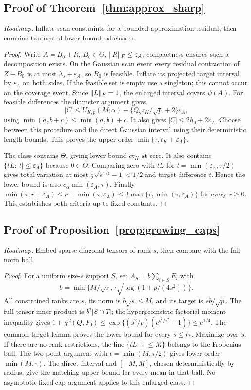\subsection{Proof of Theorem~\ref{thm:approx_sharp}}
\noindent\emph{Roadmap.} Inflate scan constraints for a bounded approximation residual, then combine two nested lower-bound subclasses.
\begin{proof}
Write $A=B_0+R$, $B_0\in\Theta$, $\lVert R\rVert_F\le\varepsilon_A$; compactness ensures such a decomposition exists. On the Gaussian scan event every residual contraction of $Z-B_0$ is at most $\lambda_s+\varepsilon_A$, so $B_0$ is feasible. Inflate its projected target interval by $\varepsilon_A$ on both sides. If the feasible set is empty use a singleton; this cannot occur on the coverage event. Since $\lVert L\rVert_F=1$, the enlarged interval covers $\psi(A)$.
For feasible differences the diameter argument gives
\[
 |C|\le U_{K,p}(M;\alpha)
       +\{Q_2z_K/\sqrt p+2\}\varepsilon_A,
\]
using $\min(a,b+c)\le\min(a,b)+c$. It also gives $|C|\le2h_0+2\varepsilon_A$.
Choose between this procedure and the direct Gaussian interval using their deterministic length bounds. This proves the upper order
$\min\{\tau,\mathfrak r_K+\varepsilon_A\}$.

The class contains $\Theta$, giving lower bound $c\mathfrak r_K$ at zero. It also contains $\{tL:|t|\le\varepsilon_A\}$ because $0\in\Theta$. Comparing zero with $tL$ for $t=\min(\varepsilon_A,\tau/2)$ gives total variation at most
$\tfrac12\sqrt{e^{1/4}-1}<1/2$ and target difference $t$. Hence the lower bound is also $c_\alpha\min(\varepsilon_A,\tau)$. Finally
$\min(\tau,r+\varepsilon_A)\le r+\min(\tau,\varepsilon_A)\le2\max\{r,\min(\tau,\varepsilon_A)\}$
for every $r\ge0$. This establishes both criteria up to fixed constants.
\end{proof}

\subsection{Proof of Proposition~\ref{prop:growing_caps}}
\noindent\emph{Roadmap.} Embed sparse diagonal tensors of rank $s$, then compare with the full norm ball.
\begin{proof}
For a uniform size-$s$ support $S$, set
$A_S=b\sum_{i\in S}E_i$ with
\[
 b=\min\{M/\sqrt s,\tau\sqrt{\log(1+p/(4s^2))}\}.
\]
All constrained ranks are $s$, its norm is $b\sqrt s\le M$, and its target is $sb/\sqrt p$. The full tensor inner product is $b^2|S\cap T|$; the hypergeometric factorial-moment inequality gives
$1+\chi^2(Q,P_0)\le\exp\{(s^2/p)(e^{b^2/\tau^2}-1)\}\le e^{1/4}$.
The common-target lemma proves the lower bound for every $s\le r_*$. Maximize over $s$.
If there are no rank restrictions, the line $\{tL:|t|\le M\}$ belongs to the Frobenius ball. The two-point argument with $t=\min(M,\tau/2)$ gives lower order $\min(M,\tau)$. The direct interval and $[-M,M]$, chosen deterministically by radius, give the matching upper bound for every mean in that ball. No asymptotic fixed-cap argument applies to this enlarged class.
\end{proof}


